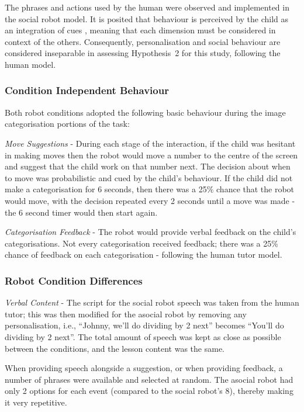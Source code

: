 The phrases and actions used by the human were observed and implemented in the social robot model. It is posited that behaviour is perceived by the child as an integration of cues \citep{zaki2013cue}, meaning that each dimension must be considered in context of the others. Consequently, personalisation and social behaviour are considered inseparable in assessing Hypothesis~2 for this study, following the human model.

\subsubsection{Condition Independent Behaviour}
Both robot conditions adopted the following basic behaviour during the image categorisation portions of the task:

\textit{Move Suggestions} - During each stage of the interaction, if the child was hesitant in making moves then the robot would move a number to the centre of the screen and suggest that the child work on that number next. The decision about when to move was probabilistic and cued by the child's behaviour. If the child did not make a categorisation for 6 seconds, then there was a 25\% chance that the robot would move, with the decision repeated every 2 seconds until a move was made - the 6 second timer would then start again.

\textit{Categorisation Feedback} - The robot would provide verbal feedback on the child's categorisations. Not every categorisation received feedback; there was a 25\% chance of feedback on each categorisation - following the human tutor model.

\subsubsection{Robot Condition Differences}\label{sec:socasoc-conditions}
\textit{Verbal Content} - The script for the social robot speech was taken from the human tutor; this was then modified for the asocial robot by removing any personalisation, i.e., ``Johnny, we'll do dividing by 2 next'' becomes ``You'll do dividing by 2 next''. The total amount of speech was kept as close as possible between the conditions, and the lesson content was the same.

When providing speech alongside a suggestion, or when providing feedback, a number of phrases were available and selected at random. The asocial robot had only 2 options for each event (compared to the social robot's 8), thereby making it very repetitive.

